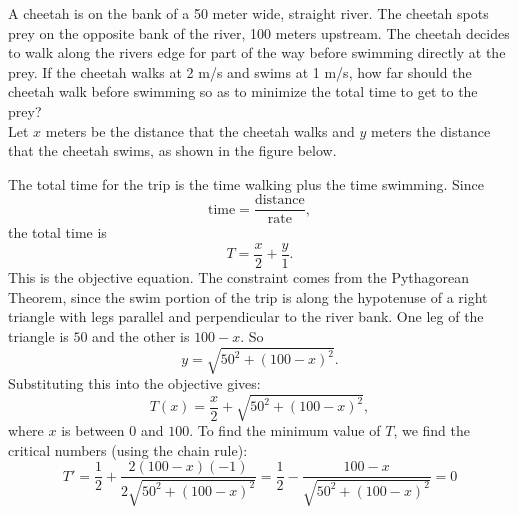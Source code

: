 \documentclass{ximera}
\begin{document}
\begin{example}[example 5]
A cheetah is on the bank of a 50 meter wide, straight river.   The cheetah spots prey on the opposite bank of the river, 100 meters upstream. 
The cheetah decides to walk along the rivers edge for part of the way before swimming directly at the prey. If the cheetah walks at 2 m/s and swims at 1 m/s,
how far should the cheetah walk before swimming so as to minimize the total time to get to the prey?\\

Let $x$ meters be the distance that the cheetah walks and $y$ meters the distance that the cheetah swims, as shown in the figure below. 


\begin{image}
\end{image}

The total time for the trip is the time walking plus the time swimming. Since 
\[
\text{time} = \frac{\text{distance}}{\text{rate}},
\]
the total time is 
\[
T = \frac{x}{2} + \frac{y}{1}.
\]
This is the objective equation.
The constraint comes from the Pythagorean Theorem, since the swim portion of the trip is along the hypotenuse of a right triangle 
with legs parallel and perpendicular to the river bank. One leg of the triangle is $50$ and the other is $100-x$.  So 
\[
y = \sqrt{50^2 + (100-x)^2}.
\]
Substituting this into the objective gives:
\[
T(x) = \frac{x}{2} + \sqrt{50^2 + (100-x)^2},\]
where $x$ is between $0$ and $100$.
To find the minimum value of $T$, we find the critical numbers (using the chain rule):
\[
T' = \frac12 +  \frac{2(100-x)(-1)}{2\sqrt{50^2 + (100-x)^2}} = \frac12 - \frac{100-x}{\sqrt{50^2 + (100-x)^2}} = 0
\]


\end{example}
\end{document}
